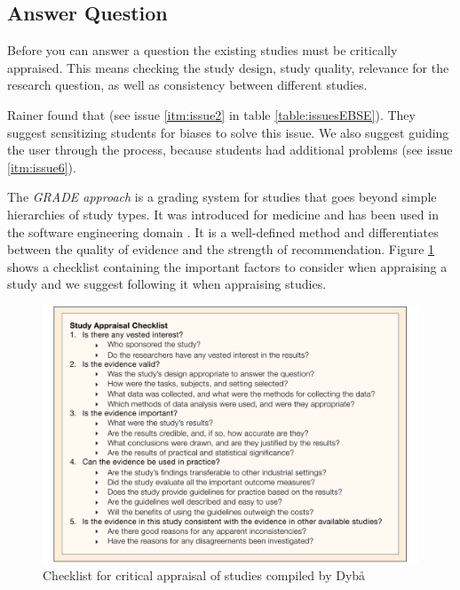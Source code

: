 
\subsection{Answer Question}
\label{subsec:answer question}

Before you can answer a question the existing studies must be critically appraised. This means checking the study design, study quality, relevance for the research question, as well as consistency between different studies. 

Rainer \etal found that  \cite{Rainer2006} (see issue \ref{itm:issue2} in table \ref{table:issuesEBSE}). They suggest sensitizing students for biases to solve this issue. We also suggest guiding the user through the process, because students had additional problems (see issue \ref{itm:issue6}). 

The \emph{GRADE approach} \cite{Atkins2004} is a grading system for studies that goes beyond simple hierarchies of study types. It was introduced for medicine and has been used in the software engineering domain \cite{Wohlin2013EvidenceProfile,Dyba2008}. It is a well-defined method and differentiates between the quality of evidence and the strength of recommendation. Figure \ref{fig:critical appraisal} shows a checklist containing the important factors to consider when appraising a study and we suggest following it when appraising studies. 

\begin{figure}
	\centering
	\includegraphics[width=12cm]{figures/study_appraisal.pdf}
\caption{Checklist for critical appraisal of studies compiled by Dyb{\aa} \etal \cite{Dyba2005} }
\label{fig:critical appraisal}
\end{figure}

